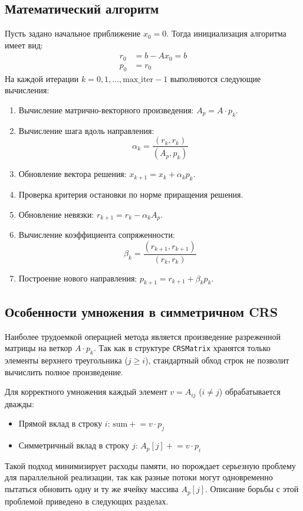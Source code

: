 \documentclass[12pt, a4paper]{article}
\begin{document}
\subsection{Математический алгоритм}
Пусть задано начальное приближение $x_0 = 0$. Тогда инициализация алгоритма имеет вид:
\begin{align*}
    r_0 &= b - Ax_0 = b \\
    p_0 &= r_0
\end{align*}
На каждой итерации $k = 0, 1, \dots, \text{max\_iter}-1$ выполняются следующие вычисления:
\begin{enumerate}
    \item Вычисление матрично-векторного произведения: $A_p = A \cdot p_k$.
    \item Вычисление шага вдоль направления:
    \begin{equation}
        \alpha_k = \frac{(r_k, r_k)}{(A_p, p_k)}
    \end{equation}
    \item Обновление вектора решения: $x_{k+1} = x_k + \alpha_k p_k$.
    \item Проверка критерия остановки по норме приращения решения.
    \item Обновление невязки: $r_{k+1} = r_k - \alpha_k A_p$.
    \item Вычисление коэффициента сопряженности:
    \begin{equation}
        \beta_k = \frac{(r_{k+1}, r_{k+1})}{(r_k, r_k)}
    \end{equation}
    \item


Построение нового направления: $p_{k+1} = r_{k+1} + \beta_k p_k$.
\end{enumerate}

\subsection{Особенности умножения в симметричном CRS}
Наиболее трудоемкой операцией метода является произведение разреженной матрицы на веткор 
$A \cdot p_k$. Так как в структуре \texttt{CRSMatrix} хранятся только элементы верхнего треугольника ($j \ge i$), 
стандартный обход строк не позволит вычислить полное произведение. 

Для корректного умножения каждый элемент $v = A_{ij}$ ($i \neq j$) обрабатывается дважды:
\begin{itemize}
    \item Прямой вклад в строку $i$: $\text{sum} \mathrel{+}= v \cdot p_j$
    \item Симметричный вклад в строку $j$: $A_p[j] \mathrel{+}= v \cdot p_i$
\end{itemize}
Такой подход минимизирует расходы памяти, но порождает серьезную проблему для параллельной реализации, 
так как разные потоки могут одновременно пытаться обновить одну и ту же ячейку массива $A_p[j]$. Описание борьбы с этой проблемой приведено в следующих разделах.
\end{document}
